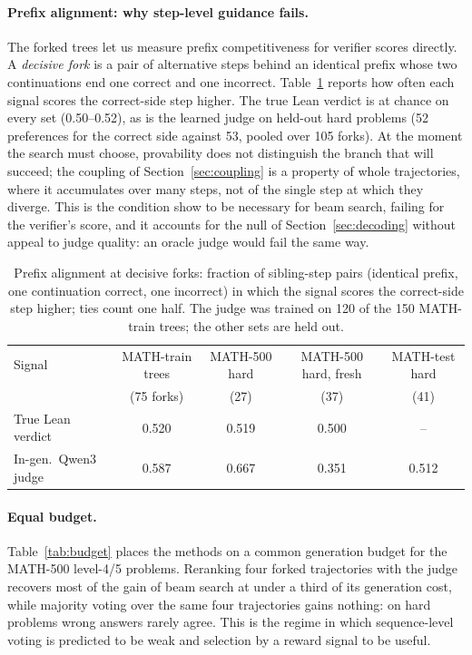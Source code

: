 \documentclass[10pt]{article}
\begin{document}
\paragraph{Prefix alignment: why step-level guidance fails.} The forked trees let us measure prefix competitiveness for verifier scores directly. A \emph{decisive fork} is a pair of alternative steps behind an identical prefix whose two continuations end one correct and one incorrect. Table~\ref{tab:align} reports how often each signal scores the correct-side step higher. The true Lean verdict is at chance on every set (0.50--0.52), as is the learned judge on held-out hard problems (52 preferences for the correct side against 53, pooled over 105 forks). At the moment the search must choose, provability does not distinguish the branch that will succeed; the coupling of Section~\ref{sec:coupling} is a property of whole trajectories, where it accumulates over many steps, not of the single step at which they diverge. This is the condition \citet{he2026provable} show to be necessary for beam search, failing for the verifier's score, and it accounts for the null of Section~\ref{sec:decoding} without appeal to judge quality: an oracle judge would fail the same way.

\begin{table}[t]
\caption{Prefix alignment at decisive forks: fraction of sibling-step pairs (identical prefix, one continuation correct, one incorrect) in which the signal scores the correct-side step higher; ties count one half. The judge was trained on 120 of the 150 MATH-train trees; the other sets are held out.}\label{tab:align}
\centering\small
\begin{tabular}{lcccc}
\toprule
Signal & MATH-train trees & MATH-500 hard & MATH-500 hard, fresh & MATH-test hard\\
 & (75 forks) & (27) & (37) & (41)\\
\midrule
True Lean verdict & 0.520 & 0.519 & 0.500 & --\\
In-gen.\ Qwen3 judge & 0.587 & 0.667 & 0.351 & 0.512\\
\bottomrule
\end{tabular}
\end{table}

\paragraph{Equal budget.} Table~\ref{tab:budget} places the methods on a common generation budget for the MATH-500 level-4/5 problems. Reranking four forked trajectories with the judge recovers most of the gain of beam search at under a third of its generation cost, while majority voting over the same four trajectories gains nothing: on hard problems wrong answers rarely agree. This is the regime in which sequence-level voting is predicted to be weak and selection by a reward signal to be useful.
\end{document}
